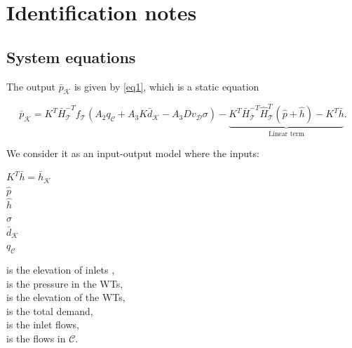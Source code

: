 


\frontmatter
{}

\section{Identification notes}

\subsection{System equations}

The output $\bar{p}_{\mathcal{K}}$ is given by \eqref{eq1}, which is a static equation

\begin{equation}
  \label{eq1}
  \bar{p}_{\mathcal{K}} = K^T \bar{H}^{-T}_{\mathcal{T}}f_{\mathcal{T}}(A_2 q_\mathcal{C} + A_3 K \bar{d}_{\mathcal{K}} - A_3 D v_{\mathcal{D}} \sigma) - \underbrace{K^T\bar{H}^{-T}_{\mathcal{T}}\hat{H}^{T}_{\mathcal{T}} (\hat{p} + \hat{h}) - K^T\bar{h}}_{\text{Linear term}} .
\end{equation}

We consider it as an input-output model where the inputs:

 \begin{minipage}[t]{0.2\textwidth}
\hspace*{6mm} $K^T\bar{h} = \bar{h}_{\mathcal{K}} $ \\
\hspace*{6mm} $\hat{p}$  \\
\hspace*{6mm} $\hat{h}$ \\
\hspace*{6mm} $\sigma$ \\
\hspace*{6mm} $\bar{d}_{\mathcal{K}}$ \\
\hspace*{6mm} $q_\mathcal{C}$
\end{minipage}
\begin{minipage}[t]{0.58\textwidth}
is the elevation of inlets ,\\
is the pressure in the WTs, \\
is the elevation of the WTs, \\
is the total demand, \\
is the inlet flows, \\
is the flows in $\mathcal{C}$.
\end{minipage}

